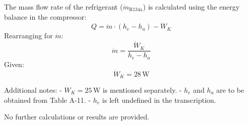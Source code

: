 The mass flow rate of the refrigerant (\( \dot{m}_{\text{R134a}} \)) is calculated using the energy balance in the compressor:  
\[
Q = \dot{m} \cdot (h_e - h_a) - \dot{W}_K
\]  
Rearranging for \( \dot{m} \):  
\[
\dot{m} = \frac{\dot{W}_K}{h_e - h_a}
\]  
Given:  
\[
\dot{W}_K = 28 \, \text{W}
\]  

Additional notes:  
- \( \dot{W}_K = 25 \, \text{W} \) is mentioned separately.  
- \( h_e \) and \( h_a \) are to be obtained from Table A-11.  
- \( h_e \) is left undefined in the transcription.  

No further calculations or results are provided.